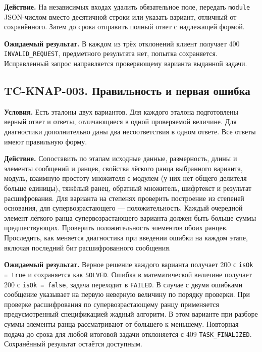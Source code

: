 \documentclass[12pt,a4paper]{article}
\begin{document}
\textbf{Действие.} На независимых входах удалить обязательное поле, передать \texttt{module} JSON-числом вместо десятичной строки или указать вариант, отличный от сохранённого. Затем до срока отправить полный ответ с надлежащей формой.

\textbf{Ожидаемый результат.} В каждом из трёх отклонений клиент получает 400 \texttt{INVALID\_\allowbreak{}REQUEST}, предметного результата нет, попытка сохраняется. Исправленный запрос направляется проверяющему варианта выданной задачи.

\subsection{TC-KNAP-003. Правильность и первая ошибка}\label{tc-knap-003-ux43fux440ux430ux432ux438ux43bux44cux43dux43eux441ux442ux44c-ux438-ux43fux435ux440ux432ux430ux44f-ux43eux448ux438ux431ux43aux430}

\hypertarget{tc-knap-003-правильность-и-первая-ошибка}{}

\hypertarget{tc-knap-003}{}

\textbf{Условия.} Есть эталоны двух вариантов. Для каждого эталона подготовлены верный ответ и ответы, отличающиеся в одной проверяемой величине. Для диагностики дополнительно даны два несоответствия в одном ответе. Все ответы имеют правильную форму.

\textbf{Действие.} Сопоставить по этапам исходные данные, размерность, длины и элементы сообщений и ранцев, свойства лёгкого ранца выбранного варианта, модуль, взаимную простоту множителя с модулем (у них нет общего делителя больше единицы), тяжёлый ранец, обратный множитель, шифртекст и результат расшифрования. Для варианта на степенях проверить построение из степеней основания, для супервозрастающего --- положительность. Каждый очередной элемент лёгкого ранца супервозрастающего варианта должен быть больше суммы предшествующих. Проверить положительность элементов обоих ранцев. Проследить, как меняется диагностика при введении ошибки на каждом этапе, включая последний бит расшифрованного сообщения.

\textbf{Ожидаемый результат.} Верное решение каждого варианта получает 200 с \texttt{is\allowbreak{}Ok =\allowbreak{} true} и сохраняется как \texttt{SOLVED}. Ошибка в математической величине получает 200 с \texttt{is\allowbreak{}Ok =\allowbreak{} false}, задача переходит в \texttt{FAILED}. В случае с двумя ошибками сообщение указывает на первую неверную величину по порядку проверки. При проверке расшифрования по супервозрастающему ранцу применяется предусмотренный спецификацией жадный алгоритм. В этом варианте при разборе суммы элементы ранца рассматривают от большего к меньшему. Повторная подача до срока для любой итоговой задачи отклоняется с 409 \texttt{TASK\_\allowbreak{}FINALIZED}. Сохранённый результат остаётся доступным.
\end{document}
